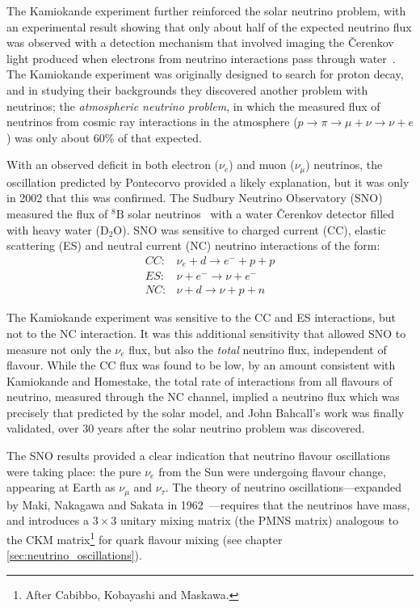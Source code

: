 The Kamiokande experiment further reinforced the solar neutrino problem, with an experimental result showing that only about half of the expected neutrino flux was observed with a detection mechanism that involved imaging the Čerenkov light produced when electrons from neutrino interactions pass through water~\citep{Hirata1989}. The Kamiokande experiment was originally designed to search for proton decay, and in studying their backgrounds they discovered another problem with neutrinos; the \emph{atmospheric neutrino problem}, in which the measured flux of neutrinos from cosmic ray interactions in the atmosphere ($p\rightarrow \pi \rightarrow \mu + \nu \rightarrow \nu + e$) was only about 60\% of that expected.

With an observed deficit in both electron ($\nu_e$) and muon ($\nu_\mu$) neutrinos, the oscillation predicted by Pontecorvo provided a likely explanation, but it was only in 2002 that this was confirmed. The Sudbury Neutrino Observatory (SNO) measured the flux of $^8\mathrm{B}$ solar neutrinos~\citep{Ahmad2001} with a water Čerenkov detector filled with heavy water ($\mathrm{D}_2\mathrm{O}$). SNO was sensitive to charged current (CC), elastic scattering (ES) and neutral current (NC) neutrino interactions of the form:
\begin{eqnarray*}
CC: & \nu_e + d \rightarrow e^{-} + p + p \\
ES: & \nu + e^{-} \rightarrow \nu + e^{-} \\
NC: & \nu + d \rightarrow \nu + p + n 
\end{eqnarray*}

The Kamiokande experiment was sensitive to the CC and ES interactions, but not to the NC interaction. It was this additional sensitivity that allowed SNO to measure not only the $\nu_e$ flux, but also the \emph{total} neutrino flux, independent of flavour. While the CC flux was found to be low, by an amount consistent with Kamiokande and Homestake, the total rate of interactions from all flavours of neutrino, measured through the NC channel, implied a neutrino flux which was precisely that predicted by the solar model, and John Bahcall's work was finally validated, over 30 years after the solar neutrino problem was discovered.

The SNO results provided a clear indication that neutrino flavour oscillations were taking place: the pure $\nu_e$ from the Sun were undergoing flavour change, appearing at Earth as $\nu_\mu$ and $\nu_\tau$. The theory of neutrino oscillations---expanded by Maki, Nakagawa and Sakata in 1962~\citep{Maki1962}---requires that the neutrinos have mass, and introduces a $3\times 3$ unitary mixing matrix (the PMNS matrix) analogous to the CKM matrix\footnote{After Cabibbo, Kobayashi and Maskawa.} for quark flavour mixing (see chapter \ref{sec:neutrino_oscillations}).

